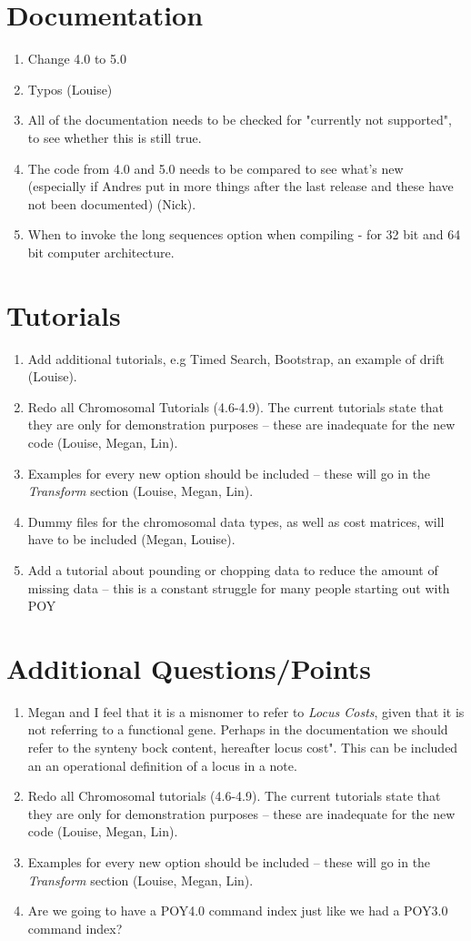 \documentclass[11pt]{article}
\begin{document}
\section{Documentation}
\begin{enumerate}
\item{Change 4.0 to 5.0}
\item{Typos (Louise)}
\item{All of the documentation needs to be checked for "currently not supported", to see whether this is still true.}
\item{The code from 4.0 and 5.0 needs to be compared to see what's new (especially if Andres put in more things after the last release and these have not been documented) (Nick).}
\item{When to invoke the long sequences option when compiling - for 32 bit and 64 bit computer architecture.}
\end{enumerate}

\section{Tutorials}
\begin{enumerate}
\item{Add additional tutorials, e.g Timed Search, Bootstrap, an example of drift (Louise).}
\item{Redo all Chromosomal Tutorials (4.6-4.9).  The current tutorials state that they are only for demonstration purposes -- these are inadequate for the new code (Louise, Megan, Lin).}
\item{Examples for every new option should be included -- these will go in the \emph{Transform} section (Louise, Megan, Lin).}
\item{Dummy files for the chromosomal data types, as well as cost matrices, will have to be included (Megan, Louise).}
\item{Add a tutorial about pounding or chopping data to reduce the amount of missing data -- this is a constant struggle for many people starting out with POY}
\end{enumerate}

\section{Additional Questions/Points}
\begin{enumerate}
\item{Megan and I feel that it is a misnomer to refer to \emph{Locus Costs}, given that it is not referring to a functional gene.  Perhaps in the documentation we should refer to the synteny bock content, hereafter locus cost".  This can be included an an operational definition of a locus in a note.}
\item{Redo all Chromosomal tutorials (4.6-4.9).  The current tutorials state that they are only for demonstration purposes -- these are inadequate for the new code (Louise, Megan, Lin).}
\item{Examples for every new option should be included -- these will go in the \emph{Transform} section (Louise, Megan, Lin).}
\item{Are we going to have a POY4.0 command index just like we had a POY3.0 command index?}
\end{enumerate}
\end{document}
